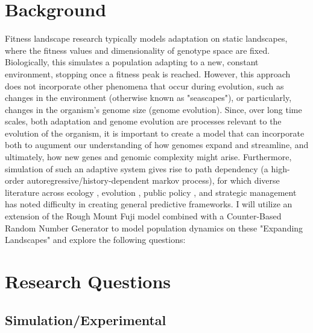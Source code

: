 \documentclass[paper=a4, fontsize=11pt,twoside]{scrartcl}       %
\begin{document}
    
    \section{Background}
	
    Fitness landscape research typically models adaptation on static landscapes, where the fitness values and dimensionality of genotype space are fixed. Biologically, this simulates a population adapting to a new, constant environment, stopping once a fitness peak is reached. However, this approach does not incorporate other phenomena that occur during evolution, such as changes in the environment (otherwise known as "seascapes"), or particularly, changes in the organism's genome size (genome evolution). Since, over long time scales, both adaptation and genome evolution are processes relevant to the evolution of the organism, it is important to create a model that can incorporate both to augument our understanding of how genomes expand and streamline, and ultimately, how new genes and genomic complexity might arise. Furthermore, simulation of such an adaptive system gives rise to path dependency (a high-order autoregressive/history-dependent markov process), for which diverse literature across ecology \cite{fukamiHistoricalContingencyCommunity2015}, evolution \cite{kauffmanProlegomenonPatternsEvolution2014}, public policy \cite{petersPoliticsPathDependency2005}, and strategic management \cite{siggelkowFirmsSystemsInterdependent2011} has noted difficulty in creating general predictive frameworks. I will utilize an extension of the Rough Mount Fuji model combined with a Counter-Based Random Number Generator to model population dynamics on these "Expanding Landscapes" and explore the following questions:      

    \section{Research Questions}

	\subsection{Simulation/Experimental}
\end{document}
